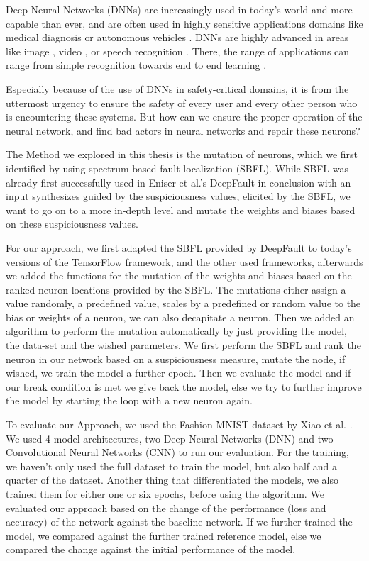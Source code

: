 Deep Neural Networks (DNNs) \cite{lecun_deep_2015} are increasingly used in today's world and more capable than ever, and are often used in highly sensitive applications domains like medical diagnosis \cite{litjens_survey_2017} or autonomous vehicles \cite{bojarski_end_2016}.
DNNs are highly advanced in areas like image \cite{krizhevsky_imagenet_2012, ciresan_multi-column_2012}, video \cite{jiang_exploiting_2018}, or speech recognition \cite{hinton_deep_2012}.
There, the range of applications can range from simple recognition towards end to end learning \cite{bojarski_end_2016}.

Especially because of the use of DNNs in safety-critical domains, it is from the uttermost urgency to ensure the safety of every user and every other person who is encountering these systems.
But how can we ensure the proper operation of the neural network, and find bad actors in neural networks and repair these neurons?

The Method we explored in this thesis is the mutation of neurons, which we first identified by using spectrum-based fault localization (SBFL).
While SBFL was already first successfully used in Eniser et al.'s DeepFault \cite{eniser_deepfault_2019} in conclusion with an input synthesizes guided by the suspiciousness values, elicited by the SBFL, we want to go on to a more in-depth level and mutate the weights and biases based on these suspiciousness values.

For our approach, we first adapted the SBFL provided by DeepFault to today's versions of the TensorFlow framework, and the other used frameworks, afterwards we added the functions for the mutation of the weights and biases based on the ranked neuron locations provided by the SBFL\@.
The mutations either assign a value randomly, a predefined value, scales by a predefined or random value to the bias or weights of a neuron, we can also decapitate a neuron.
Then we added an algorithm to perform the mutation automatically by just providing the model, the data-set and the wished parameters.
We first perform the SBFL and rank the neuron in our network based on a suspiciousness measure, mutate the node, if wished, we train the model a further epoch.
Then we evaluate the model and if our break condition is met we give back the model, else we try to further improve the model by starting the loop with a new neuron again.

To evaluate our Approach, we used the Fashion-MNIST dataset by Xiao et al. \cite{xiao_fashion-mnist_2017}.
We used 4 model architectures, two Deep Neural Networks (DNN) and two Convolutional Neural Networks (CNN) to run our evaluation.
For the training, we haven't only used the full dataset to train the model, but also half and a quarter of the dataset.
Another thing that differentiated the models, we also trained them for either one or six epochs, before using the algorithm.
We evaluated our approach based on the change of the performance (loss and accuracy) of the network against the baseline network.
If we further trained the model, we compared against the further trained reference model, else we compared the change against the initial performance of the model.

